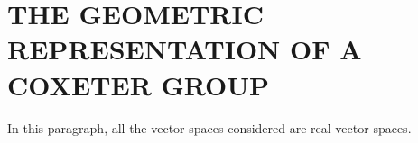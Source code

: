 \section{THE GEOMETRIC REPRESENTATION OF A COXETER GROUP}

In this paragraph, all the vector spaces considered are real vector spaces.

